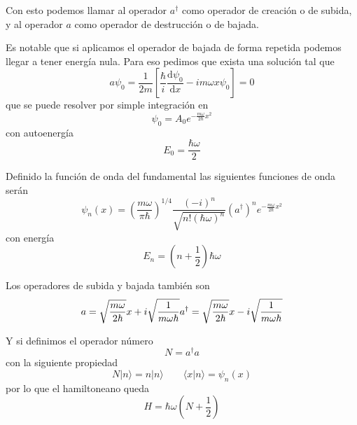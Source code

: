 Con esto podemos llamar al operador $a^{\dagger}$ como operador de creación o de subida, y al operador $a$ como operador de destrucción o de bajada.

Es notable que si aplicamos el operador de bajada de forma repetida podemos llegar a tener energía nula.
Para eso pedimos que exista una solución tal que
\begin{equation}
    a \psi_0 = \frac{1}{2m} \left[\frac{\hbar}{i} \frac{\mathrm{d}\psi_0}{\mathrm{d}x} - i m \omega x \psi_0 \right] = 0
\end{equation}
que se puede resolver por simple integración en
\begin{equation}
    \psi_0 = A_0 e^{-\frac{m \omega}{2\hbar} x^2}
\end{equation}
con autoenergía
\begin{equation}
    E_0 = \frac{\hbar\omega}{2}
\end{equation}

Definido la función de onda del fundamental las siguientes funciones de onda serán
\begin{equation}
    \psi_n(x) = \left(\frac{m \omega}{\pi \hbar}\right)^{1/4} \frac{(-i)^n}{\sqrt{n!(\hbar \omega)^n}} (a^\dagger)^n e^{-\frac{m \omega}{2\hbar} x^2}
\end{equation}
con energía
\begin{equation}
    E_n = \left(n + \frac{1}{2}\right) \hbar \omega
\end{equation}

Los operadores de subida y bajada también son
\begin{equation}
    a = \sqrt{\frac{m \omega}{2 \hbar}} x + i \sqrt{\frac{1}{m \omega \hbar}} \\ a^{\dagger} =  \sqrt{\frac{m \omega}{2 \hbar}} x - i \sqrt{\frac{1}{m \omega \hbar}}
\end{equation}

Y si definimos el operador número
\begin{equation}
    N = a^\dagger a
\end{equation}
con la siguiente propiedad
\begin{equation}
    N |n\rangle = n |n\rangle \qquad \langle x | n \rangle = \psi_n(x)
\end{equation}
por lo que el hamiltoneano queda
\begin{equation}
    H = \hbar \omega \left(N + \frac{1}{2}\right)
\end{equation}

